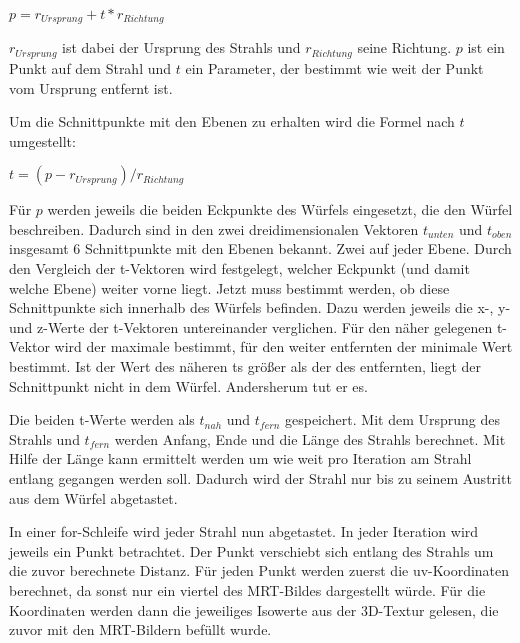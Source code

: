 $p=r_{Ursprung}+t*r_{Richtung}$

$r_{Ursprung}$ ist dabei der Ursprung des Strahls und $r_{Richtung}$ seine Richtung. $p$ ist ein Punkt auf dem Strahl und $t$ ein Parameter, der bestimmt wie weit der Punkt vom Ursprung entfernt ist.

Um die Schnittpunkte mit den Ebenen zu erhalten wird die Formel nach $t$ umgestellt:

$t=(p-r_{Ursprung})/r_{Richtung}$

Für $p$ werden jeweils die beiden Eckpunkte des Würfels eingesetzt, die den Würfel beschreiben. Dadurch sind in den zwei dreidimensionalen Vektoren $t_{unten}$ und $t_{oben}$ insgesamt 6 Schnittpunkte mit den Ebenen bekannt. Zwei auf jeder Ebene. Durch den Vergleich der t-Vektoren wird festgelegt, welcher Eckpunkt (und damit welche Ebene) weiter vorne liegt. 
Jetzt muss bestimmt werden, ob diese Schnittpunkte sich innerhalb des Würfels befinden.
Dazu werden jeweils die x-, y- und z-Werte der t-Vektoren untereinander verglichen. Für den näher gelegenen t-Vektor wird der maximale bestimmt, für den weiter entfernten der minimale Wert bestimmt. Ist der Wert des näheren ts größer als der des entfernten, liegt der Schnittpunkt nicht in dem Würfel. Andersherum tut er es.

Die beiden t-Werte werden als $t_{nah}$ und $t_{fern}$ gespeichert.
Mit dem Ursprung des Strahls und $t_{fern}$ werden Anfang, Ende und die Länge des Strahls berechnet. Mit Hilfe der Länge kann ermittelt werden um wie weit pro Iteration am Strahl entlang gegangen werden soll. Dadurch wird der Strahl nur bis zu seinem Austritt aus dem Würfel abgetastet. 

In einer for-Schleife wird jeder Strahl nun abgetastet. In jeder Iteration wird jeweils ein Punkt betrachtet. Der Punkt verschiebt sich entlang des Strahls um die zuvor berechnete Distanz.
Für jeden Punkt werden zuerst die uv-Koordinaten berechnet, da sonst nur ein viertel des MRT-Bildes dargestellt würde.
Für die Koordinaten werden dann die jeweiliges Isowerte aus der 3D-Textur gelesen, die zuvor mit den MRT-Bildern befüllt wurde.

